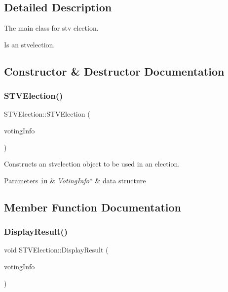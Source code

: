 \subsection{Detailed Description}
The main class for stv election. 

Is an stvelection. 

\subsection{Constructor \& Destructor Documentation}
\mbox{\label{classSTVElection_a6abe30e81059242a53f0c06c29331d10}} 
\subsubsection{\texorpdfstring{S\+T\+V\+Election()}{STVElection()}}
{\footnotesize\ttfamily S\+T\+V\+Election\+::\+S\+T\+V\+Election (\begin{DoxyParamCaption}\item[{\hyperlink{classVotingInfo}{Voting\+Info} $\ast$}]{voting\+Info }\end{DoxyParamCaption})\hspace{0.3cm}{\ttfamily [explicit]}}



Constructs an stvelection object to be used in an election. 


\begin{DoxyParams}[1]{Parameters}
\mbox{\tt in}  & {\em Voting\+Info$\ast$} & data structure \\
\hline
\end{DoxyParams}


\subsection{Member Function Documentation}
\mbox{\label{classSTVElection_aac94522a407b09ee5030abe88c61a1e8}} 
\subsubsection{\texorpdfstring{Display\+Result()}{DisplayResult()}}
{\footnotesize\ttfamily void S\+T\+V\+Election\+::\+Display\+Result (\begin{DoxyParamCaption}\item[{\hyperlink{classVotingInfo}{Voting\+Info} $\ast$}]{voting\+Info }\end{DoxyParamCaption})}



